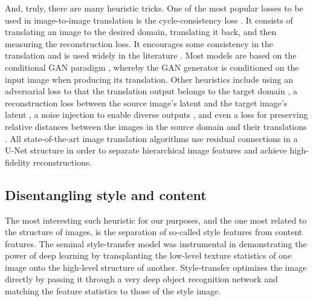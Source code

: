 \documentclass[withindex,glossary,firstyr,times]{cam-thesis}
\begin{document}
And, truly, there are many heuristic tricks. One of the most popular losses to be used in image-to-image translation is the cycle-consistency loss \cite{zhu2017unpaired}. It consists of translating an image to the desired domain, translating it back, and then measuring the reconstruction loss. It encourages some consistency in the translation and is used widely in the literature \cite{liu2017unsupervised, royer2020xgan, lee2018diverse}. Most models are based on the conditional GAN paradigm \cite{mirza2014conditional}, whereby the GAN generator is conditioned on the input image when producing its translation. Other heuristics include using an adversarial loss to that the translation output belongs to the target domain \cite{taigman2016unsupervised, liu2017unsupervised, huang2018multimodal, choi2018stargan, royer2020xgan}, a reconstruction loss between the source image's latent and the target image's latent \cite{taigman2016unsupervised, royer2020xgan, liu2019few}, a noise injection to enable diverse outputs \cite{huang2018multimodal, lee2018diverse}, and even a loss for preserving relative distances between the images in the source domain and their translations \cite{benaim2018one}. All state-of-the-art image translation algorithms use residual connections in a U-Net structure \cite{ronneberger2015u} in order to separate hierarchical image features and achieve high-fidelity reconstructions.

\subsection{Disentangling style and content}

The most interesting such heuristic for our purposes, and the one most related to the structure of images, is the separation of so-called style features from content features. The seminal style-transfer model \cite{gatys2015neural, gatys2016image} was instrumental in demonstrating the power of deep learning by transplanting the low-level texture statistics of one image onto the high-level structure of another. Style-transfer optimizes the image directly by passing it through a very deep object recognition network and matching the feature statistics to those of the style image.
\end{document}
